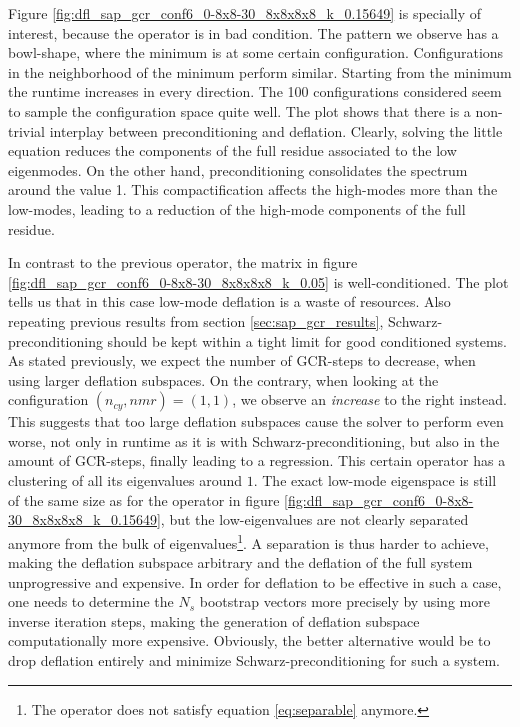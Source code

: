 \documentclass{article}
\theoremstyle{plain} %
\theoremstyle{convention} %
\theoremstyle{remark} %
\numberwithin{equation}{section}
\begin{document}
Figure \ref{fig:dfl_sap_gcr_conf6_0-8x8-30_8x8x8x8_k_0.15649} is specially of interest, because the operator is in bad condition. The pattern we observe has a bowl-shape, where the minimum is at some certain configuration. Configurations in the neighborhood of the minimum perform similar. Starting from the minimum the runtime increases in every direction. The \num{100} configurations considered seem to sample the configuration space quite well. The plot shows that there is a non-trivial interplay between preconditioning and deflation. Clearly, solving the little equation reduces the components of the full residue associated to the low eigenmodes. On the other hand, preconditioning consolidates the spectrum around the value \num{1}. This compactification affects the high-modes more than the low-modes, leading to a reduction of the high-mode components of the full residue.

In contrast to the previous operator, the matrix in figure \ref{fig:dfl_sap_gcr_conf6_0-8x8-30_8x8x8x8_k_0.05} is well-conditioned. The plot tells us that in this case low-mode deflation is a waste of resources. Also repeating previous results from section \ref{sec:sap_gcr_results}, Schwarz-preconditioning should be kept within a tight limit for good conditioned systems. As stated previously, we expect the number of GCR-steps to decrease, when using larger deflation subspaces. On the contrary, when looking at the configuration $(n_{cy},n{mr}) = (1,1)$, we observe an \textit{increase} to the right instead. This suggests that too large deflation subspaces cause the solver to perform even worse, not only in runtime as it is with Schwarz-preconditioning, but also in the amount of GCR-steps, finally leading to a regression. This certain operator has a clustering of all its eigenvalues around $1$. The exact low-mode eigenspace is still of the same size as for the operator in figure \ref{fig:dfl_sap_gcr_conf6_0-8x8-30_8x8x8x8_k_0.15649}, but the low-eigenvalues are not clearly separated anymore from the bulk of eigenvalues\footnote{The operator does not satisfy equation \eqref{eq:separable} anymore.}. A separation is thus harder to achieve, making the deflation subspace arbitrary and the deflation of the full system unprogressive and expensive. In order for deflation to be effective in such a case, one needs to determine the $N_s$ bootstrap vectors more precisely by using more inverse iteration steps, making the generation of deflation subspace computationally more expensive. Obviously, the better alternative would be to drop deflation entirely and minimize Schwarz-preconditioning for such a system.
\end{document}
